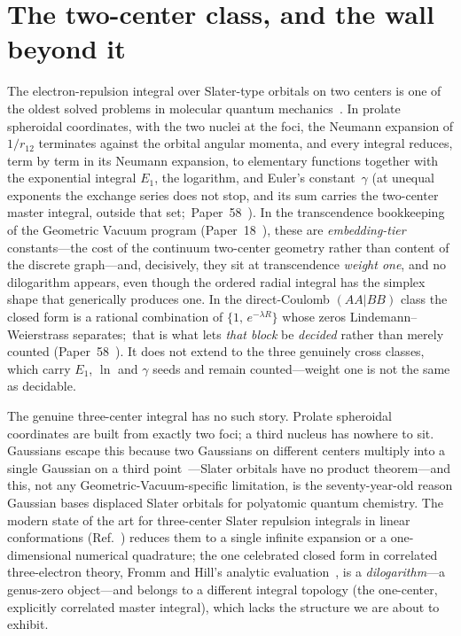 \documentclass[aps,pra,twocolumn,superscriptaddress,longbibliography]{revtex4-2}
\begin{document}
\section{The two-center class, and the wall beyond it}

The electron-repulsion integral over Slater-type orbitals on two centers is
one of the oldest solved problems in molecular quantum
mechanics~\cite{harris_michels1967}.  In prolate
spheroidal coordinates, with the two nuclei at the foci, the Neumann
expansion of $1/r_{12}$ terminates against the orbital angular momenta, and
every integral reduces, term by term in its Neumann expansion, to elementary
functions together with the exponential integral $E_{1}$, the logarithm, and
Euler's constant~$\gamma$ (at unequal exponents the exchange series does not
stop, and its sum carries the two-center master integral, outside that set;\
Paper~58~\cite{loutey_paper58}).  In the
transcendence bookkeeping of the Geometric Vacuum program (Paper~18~\cite{loutey_paper18}), these
are \emph{embedding-tier} constants---the cost of the continuum two-center
geometry rather than content of the discrete graph---and, decisively, they
sit at transcendence \emph{weight one}, and no dilogarithm appears, even
though the ordered radial integral has the simplex shape that generically
produces one.  In the direct-Coulomb $(AA|BB)$ class the closed form is a rational
combination of $\{1,\,e^{-\lambda R}\}$ whose zeros Lindemann--Weierstrass
separates;\ that is what lets \emph{that block} be \emph{decided} rather than
merely counted (Paper~58~\cite{loutey_paper58}).  It does not extend to the
three genuinely cross classes, which carry $E_1$, $\ln$ and $\gamma$ seeds and
remain counted---weight one is not the same as decidable.

The genuine three-center integral has no such story.  Prolate spheroidal
coordinates are built from exactly two foci; a third nucleus has nowhere to
sit.  Gaussians escape this because two Gaussians on different centers
multiply into a single Gaussian on a third point~\cite{boys1950}---Slater
orbitals have no product theorem---and this, not any Geometric-Vacuum-specific
limitation, is the seventy-year-old reason Gaussian bases displaced Slater
orbitals for polyatomic quantum chemistry.  The modern state of the art for three-center
Slater repulsion integrals in linear conformations (Ref.~\cite{ozdogan2012}) reduces them to a single
infinite expansion or a one-dimensional numerical quadrature; the one
celebrated closed form in correlated three-electron theory, Fromm and Hill's
analytic evaluation~\cite{fromm_hill1987}, is a \emph{dilogarithm}---a
genus-zero object---and belongs to a different integral topology (the
one-center, explicitly correlated master integral), which lacks the structure
we are about to exhibit.
\end{document}
